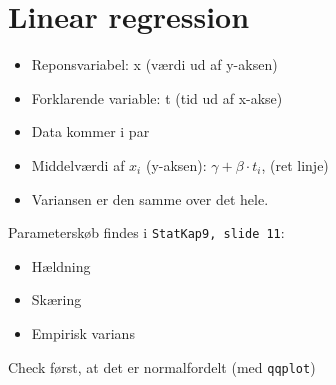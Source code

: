 \documentclass[Main]{subfiles}
\begin{document}
\chapter{Linear regression}

\begin{itemize}
	\item Reponsvariabel: x (værdi ud af y-aksen)
	\item Forklarende variable: t (tid ud af x-akse)
	\item Data kommer i par
	\item Middelværdi af $x_i$ (y-aksen): $\gamma + \beta \cdot t_i$, (ret linje)
	\item Variansen er den samme over det hele.
\end{itemize}

Parameterskøb findes i \texttt{StatKap9, slide 11}:
\begin{itemize}
	\item Hældning
	\item Skæring
	\item Empirisk varians
\end{itemize}

Check først, at det er normalfordelt (med \texttt{qqplot})
\end{document}
